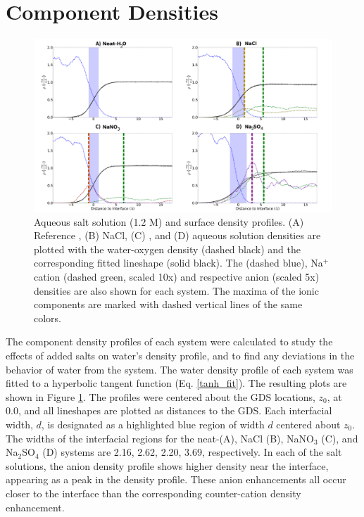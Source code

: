 \section{Component Densities}

\begin{figure}[h!]
\begin{center}
	\includegraphics{images/densities.png}
	\caption{Aqueous salt solution (1.2 M) and \ctc surface density profiles. (A) Reference \ctcwat, (B) NaCl, (C) \sodnit, and (D) \sodsul aqueous solution densities are plotted with the water-oxygen density (dashed black) and the corresponding fitted lineshape (solid black). The \ctc (dashed blue), Na$^+$ cation (dashed green, scaled 10x) and respective anion (scaled 5x) densities are also shown for each system. The maxima of the ionic components are marked with dashed vertical lines of the same colors.}
	\label{fig:density-plots}
\end{center}
\end{figure}

The component density profiles of each system were calculated to study the effects of added salts on water's density profile, and to find any deviations in the behavior of water from the \ctcwat system. The water density profile of each system was fitted to a hyperbolic tangent function (Eq. \ref{tanh_fit}). The resulting plots are shown in Figure \ref{fig:density-plots}. The profiles were centered about the GDS locations, $z_0$, at 0.0\angs, and all lineshapes are plotted as distances to the GDS. Each interfacial width, $d$, is designated as a highlighted blue region of width $d$ centered about $z_0$.  The widths of the interfacial regions for the neat-\ctcwat (A), NaCl (B), NaNO$_3$ (C), and Na$_2$SO$_4$ (D) systems are 2.16, 2.62, 2.20, 3.69\angs, respectively. In each of the salt solutions, the anion density profile shows higher density near the interface, appearing as a peak in the density profile. These anion enhancements all occur closer to the interface than the corresponding counter-cation density enhancement. 


